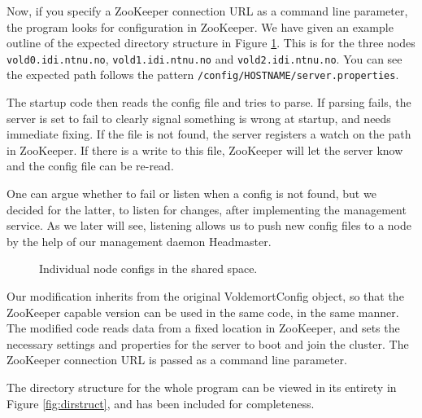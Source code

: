 Now, if you specify a ZooKeeper connection URL as a command line parameter, the program looks for configuration in ZooKeeper.
We have given an example outline of the expected directory structure in Figure \ref{fig:configdirs}. This is for the three nodes \texttt{vold0.idi.ntnu.no}, \texttt{vold1.idi.ntnu.no} and \texttt{vold2.idi.ntnu.no}. You can see the expected path follows the pattern \texttt{/config/HOSTNAME/server.properties}. 

The startup code then reads the config file and tries to parse. If parsing fails, the server is set to fail to clearly signal something is wrong at startup, and needs immediate fixing. If the file is not found, the server registers a watch on the path in ZooKeeper. If there is a write to this file, ZooKeeper will let the server know and the config file can be re-read. 

One can argue whether to fail or listen when a config is not found, but we decided for the latter, to listen for changes, after implementing the management service. As we later will see, listening allows us to push new config files to a node by the help of our management daemon Headmaster. 

\begin{figure}[h]
\caption{Individual node configs in the shared space.}
\label{fig:configdirs}
\end{figure}

Our modification inherits from the original VoldemortConfig object, so that the ZooKeeper capable version can be used in the same code, in the same manner. The modified code reads data from a fixed location in ZooKeeper, and sets the necessary settings and properties for the server to boot and join the cluster. The ZooKeeper connection URL is passed as a command line parameter.

The directory structure for the whole program can be viewed in its entirety in Figure \ref{fig:dirstruct}, and has been included for completeness.

